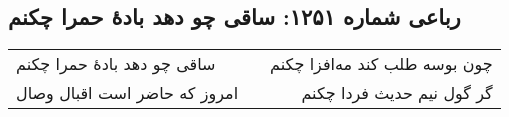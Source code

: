 \begin{center}
\section*{رباعی شماره ۱۲۵۱: ساقی چو دهد بادهٔ حمرا چکنم}
\label{sec:1251}
\begin{longtable}{l p{0.5cm} r}
ساقی چو دهد بادهٔ حمرا چکنم
&&
چون بوسه طلب کند مه‌افزا چکنم
\\
امروز که حاضر است اقبال وصال
&&
گر گول نیم حدیث فردا چکنم
\\
\end{longtable}
\end{center}
